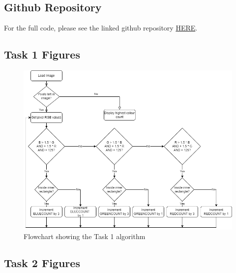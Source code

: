 \documentclass[conference]{IEEEtran}
\begin{document}
\printbibliography


\onecolumn
\subsection{Github Repository}

For the full code, please see the linked github repository \href{https://github.com/jjpendlebury/AINT308-Coursework}{HERE}.
\subsection{Task 1 Figures}\label{app:T1}

\begin{figure}[H]
\centering
\includegraphics[width=5in]{Task1_flowchart}
\caption{Flowchart showing the Task 1 algorithm}
\label{fig:task1_flowchart}
\end{figure}

\subsection{Task 2 Figures}\label{app:T2}
\end{document}

